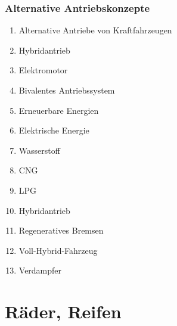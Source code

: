 \subsubsection{Alternative
Antriebskonzepte}\label{alternative-antriebskonzepte}

\begin{enumerate}
\item
  Alternative Antriebe von Kraftfahrzeugen\\
\item
  Hybridantrieb\\
\item
  Elektromotor\\
\item
  Bivalentes Antriebssystem\\
\item
  Erneuerbare Energien\\
\item
  Elektrische Energie\\
\item
  Wasserstoff\\
\item
  CNG\\
\item
  LPG\\
\item
  Hybridantrieb\\
\item
  Regeneratives Bremsen\\
\item
  Voll-Hybrid-Fahrzeug\\
\item
  Verdampfer
\end{enumerate}

\section{Räder, Reifen}\label{raeder-reifen}

